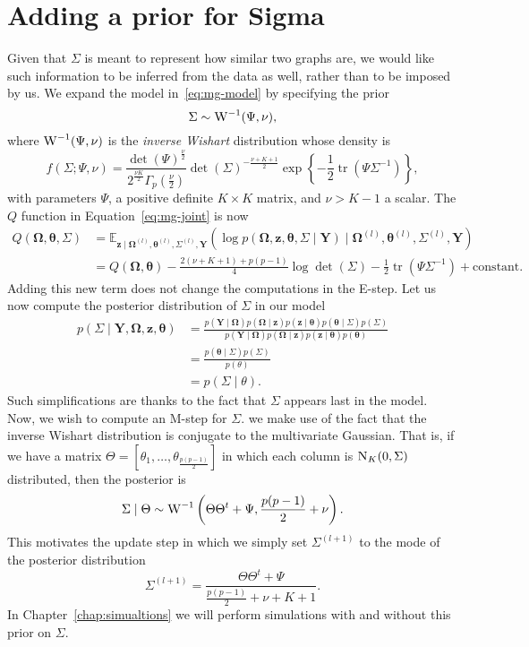 \documentclass[a4paper, 11pt, oneside]{report}
\DeclareMathOperator{\tr}{tr}
\newcommand{\E}{\mathbb{E}}
\newcommand{\1}{\mathds{1}}
\newcommand{\powl}{^{(l)}}
\newcommand{\inv}{^{-1}}
\newcommand{\Nor}{\textsc{N}}
\newcommand{\bOmega}{\mathbf{\Omega}}
\newcommand{\bz}{\mathbf{z}}
\newcommand{\btheta}{\mathbf{\theta}}
\newcommand{\bY}{\mathbf{Y}}
\begin{document}
\section{Adding a prior for Sigma} %
Given that $\Sigma$ is meant to represent how similar two graphs are,
we would like such information to be inferred from the data as well, rather than to be imposed by us.
We expand the model in~\eqref{eq:mg-model} by specifying the prior
\[\Sigma \sim \textsc{W}\inv(\Psi, \nu),\]
where $\textsc{W}\inv(\Psi, \nu)$ is the \emph{inverse Wishart} distribution whose density is
\[f(\Sigma; \Psi, \nu) = \frac{\det(\Psi)^\frac{\nu}{2}}{2^\frac{\nu K}{2} \Gamma_p(\frac{\nu}{2})} \det(\Sigma)^{-\frac{\nu + K + 1}{2}} \exp\left\{-\frac{1}{2} \tr(\Psi \Sigma\inv)\right\},\]
with parameters $\Psi$, a positive definite $K \times K$ matrix, and $\nu > K - 1$ a scalar.
The $Q$ function in Equation~\eqref{eq:mg-joint} is now 
\begin{align*}
  Q(\mathbf{\Omega}, \mathbf{\theta}, \Sigma) &=  \E_{\mathbf{z} \mid
	\mathbf{\Omega}\powl, \mathbf{\theta}\powl, \Sigma\powl, \mathbf{Y}}(\log
	p(\mathbf{\Omega},  \mathbf{z}, \mathbf{\theta}, \Sigma \mid \mathbf{Y}) \mid
	\mathbf{\Omega}\powl, \mathbf{\theta}\powl, \Sigma\powl, \mathbf{Y})                    \\
                                              &= Q(\bOmega, \btheta) - \frac{2(\nu + K + 1) + p(p-1)}{4} \log\det(\Sigma) - \frac{1}{2} \tr(\Psi \Sigma\inv) + \text{constant}.
\end{align*}
Adding this new term does not change the computations in the E-step. %
Let us now compute the posterior distribution of $\Sigma$ in our model
\begin{align*}
  p(\Sigma \mid \bY, \bOmega, \bz, \btheta) &= \frac{p(\bY \mid \bOmega) p(\bOmega \mid \bz) p(\bz \mid \btheta) p(\btheta \mid \Sigma) p(\Sigma)}{p(\bY \mid \bOmega) p(\bOmega \mid \bz) p(\bz \mid \btheta) p(\btheta)} \\
                                            &= \frac{p(\btheta \mid \Sigma) p(\Sigma)}{p(\theta)} \\
                                            &= p(\Sigma \mid \theta).
\end{align*}
Such simplifications are thanks to the fact that $\Sigma$ appears last in the model.
Now, we wish to compute an M-step for $\Sigma$. 
we make use of the fact that the inverse Wishart distribution is conjugate to the multivariate Gaussian.
That is, if we have a matrix $\Theta = [\theta_1, \dots, \theta_{\frac{p(p-1)}{2}}]$ in which each column
is $\Nor_K (0, \Sigma)$ distributed, then the posterior is
\[\Sigma \mid \Theta \sim \textsc{W}\inv\left(\Theta \Theta^t + \Psi, \frac{p(p-1)}{2} + \nu\right).\]
This motivates the update step in which we simply set $\Sigma^{(l+1)}$ to the mode of the posterior distribution
\[\Sigma^{(l+1)} = \frac{\Theta \Theta^t + \Psi}{\frac{p(p-1)}{2} + \nu + K + 1}.\]
In Chapter~\ref{chap:simualtions} we will perform simulations with and without this prior on $\Sigma$.
\end{document}
